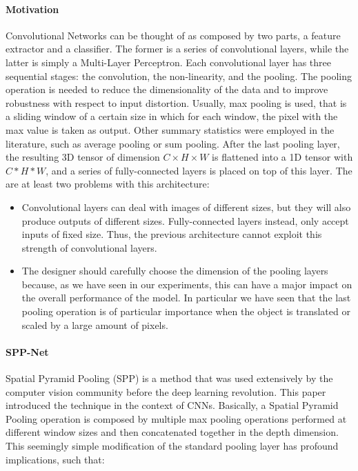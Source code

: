 \documentclass[../main.tex]{subfiles}
\begin{document}
    \paragraph{Motivation}
    Convolutional Networks can be thought of as composed by two parts, a feature extractor and a classifier. The former is a
    series of convolutional layers, while the latter is simply a Multi-Layer Perceptron.
    Each convolutional layer has three sequential stages: the convolution, the non-linearity, and the pooling.
    The pooling operation is needed to reduce the dimensionality of the data and to improve robustness with respect to input distortion.
    Usually, max pooling is used, that is a sliding window of a certain size in which for each window, the pixel with the max value is taken
    as output. Other summary statistics were employed in the literature, such as average pooling or sum pooling.
    After the last pooling layer, the resulting 3D tensor of dimension $C \times H \times W$ is flattened into a 1D tensor with $C * H * W$,
    and a series of fully-connected layers is placed on top of this layer. The are at least two problems with this architecture:
    \begin{itemize}
        \item Convolutional layers can deal with images of different sizes, but they will also produce outputs of different sizes. Fully-connected
            layers instead, only accept inputs of fixed size. Thus, the previous architecture cannot exploit this strength of convolutional layers.
        \item The designer should carefully choose the dimension of the pooling layers because, as we have seen in our experiments, this can have
            a major impact on the overall performance of the model. In particular we have seen that the last pooling operation is of particular
            importance when the object is translated or scaled by a large amount of pixels.
    \end{itemize}
    
    \paragraph{SPP-Net}
    Spatial Pyramid Pooling (SPP) is a method that was used extensively by the computer vision community before the deep learning revolution.
    This paper~\cite{sppooling} introduced the technique in the context of CNNs. Basically, a Spatial Pyramid Pooling operation
    is composed by multiple max pooling operations performed at different window sizes and then concatenated together in the depth dimension.
    This seemingly simple modification of the standard pooling layer has profound implications, such that:
\end{document}
